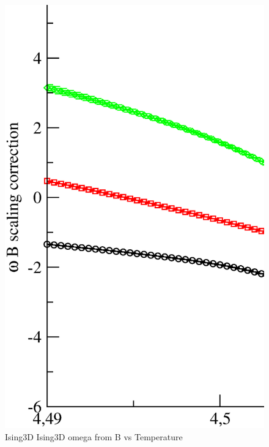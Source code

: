 \begin{figure}[!htpb]
  \centering
  \includegraphics[width=\textwidth]{./plots/Ising3D/Ising3D_omega_from_B_vs_Temperature.eps}
  \caption{Ising3D Ising3D omega from B vs Temperature}
\end{figure}

